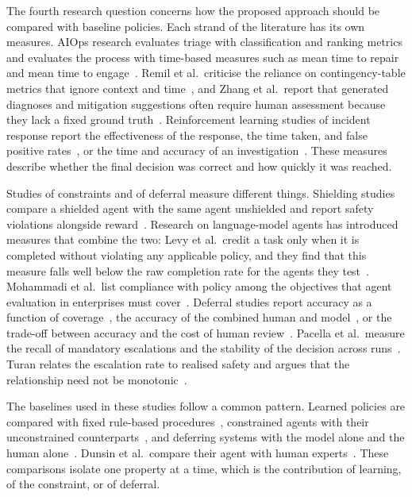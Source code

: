 \documentclass[12pt,a4paper]{article}
\begin{document}
The fourth research question concerns how the proposed approach should be compared with baseline policies. Each strand of the literature has its own measures. AIOps research evaluates triage with classification and ranking metrics and evaluates the process with time-based measures such as mean time to repair and mean time to engage~\cite{remil2024}. Remil et al.\ criticise the reliance on contingency-table metrics that ignore context and time~\cite{remil2024}, and Zhang et al.\ report that generated diagnoses and mitigation suggestions often require human assessment because they lack a fixed ground truth~\cite{zhang2025}. Reinforcement learning studies of incident response report the effectiveness of the response, the time taken, and false positive rates~\cite{ren2025}, or the time and accuracy of an investigation~\cite{dunsin2025}. These measures describe whether the final decision was correct and how quickly it was reached.

Studies of constraints and of deferral measure different things. Shielding studies compare a shielded agent with the same agent unshielded and report safety violations alongside reward~\cite{alshiekh2018,jansen2020}. Research on language-model agents has introduced measures that combine the two: Levy et al.\ credit a task only when it is completed without violating any applicable policy, and they find that this measure falls well below the raw completion rate for the agents they test~\cite{levy2026}. Mohammadi et al.\ list compliance with policy among the objectives that agent evaluation in enterprises must cover~\cite{mohammadi2025}. Deferral studies report accuracy as a function of coverage~\cite{geifman2019}, the accuracy of the combined human and model~\cite{madras2018}, or the trade-off between accuracy and the cost of human review~\cite{bachar2026}. Pacella et al.\ measure the recall of mandatory escalations and the stability of the decision across runs~\cite{pacella2026}. Turan relates the escalation rate to realised safety and argues that the relationship need not be monotonic~\cite{turan2026}.

The baselines used in these studies follow a common pattern. Learned policies are compared with fixed rule-based procedures~\cite{ren2025,pacella2026}, constrained agents with their unconstrained counterparts~\cite{alshiekh2018,jansen2020,pacella2026}, and deferring systems with the model alone and the human alone~\cite{madras2018,zhang2026falcon}. Dunsin et al.\ compare their agent with human experts~\cite{dunsin2025}. These comparisons isolate one property at a time, which is the contribution of learning, of the constraint, or of deferral.
\end{document}
